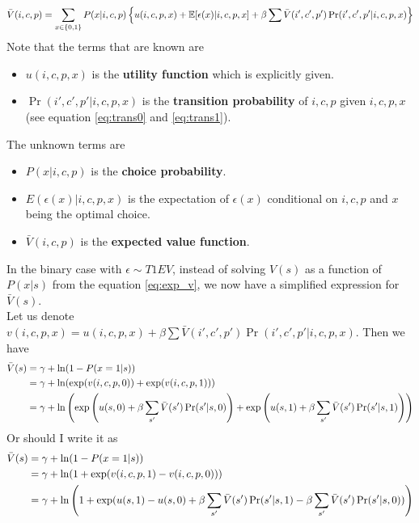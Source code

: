 \documentclass[12pt]{article}[margin=1in]
\begin{document}
\begin{equation}\label{eq:exp_v}
    \bar{V}(i,c,p) =\sum_{x \in \{0,1\}} P(x|i,c,p) \left\{ u(i,c,p,x) + \mathbb{E}[\epsilon(x)|i,c,p,x] + \beta \sum \bar{V}(i',c',p') \Pr(i',c',p'|i,c,p,x) \right\}
\end{equation}
Note that the terms that are known are
\begin{itemize}
    \item $u(i,c,p,x)$ is the \textbf{utility function} which is explicitly given.
    \item $\Pr(i',c',p'|i,c,p,x)$ is the \textbf{transition probability} of $i,c,p$ given $i,c,p,x$ (see equation \ref{eq:trans0} and \ref{eq:trans1}).
\end{itemize}
The unknown terms are
\begin{itemize}
    \item $P(x|i,c,p)$ is the \textbf{choice probability}.
    \item $E(\epsilon(x)|i,c,p,x)$ is the expectation of $\epsilon(x)$ conditional on $i,c,p$ and $x$ being the optimal choice.
    \item $\bar{V}(i,c,p)$ is the \textbf{expected value function}.

\end{itemize}
In the binary case with $\epsilon \sim T1EV$, instead of solving $V(s)$ as a function of $P(x|s)$ from the equation \ref{eq:exp_v}, we now have a simplified expression for $\bar{V}(s)$. \\
Let us denote ${v}(i,c,p,x) = u(i,c,p,x) +  \beta \sum \bar{V}(i',c',p') \Pr(i',c',p'|i,c,p,x)$. Then we have
\begin{equation}\label{eq:exp_v_binary}
    \begin{split}
        \bar{V}(s) & =  \gamma + \ln (1-P(x=1|s))                                                                                                        \\
                   & =  \gamma + \ln (\exp({v}(i,c,p,0)) + \exp({v}(i,c,p,1)))                                                                           \\
                   & =  \gamma + \ln\left(\exp\left(u(s,0) +  \beta \sum_{s'} \bar{V}(s') \Pr(s'|s,0)\right) + \exp\left(u(s,1) +  \beta \sum_{s'} \bar{V}(s') \Pr(s
                '|s,1)\right)\right)
    \end{split}
\end{equation}
Or should I write it as
\begin{equation}
    \begin{split}
        \bar{V}(s) & =  \gamma + \ln (1-P(x=1|s))                                                                                                      \\
                   & =  \gamma + \ln (1+\exp({v}(i,c,p,1)-{v}(i,c,p,0)))                                                                               \\
                   & =  \gamma + \ln\left(1+ \exp(u(s,1) - u(s,0) +  \beta \sum_{s'} \bar{V}(s') \Pr(s'|s,1) - \beta \sum_{s'} \bar{V}(s') \Pr(s'|s,0))\right)
    \end{split}
\end{equation}
\end{document}
